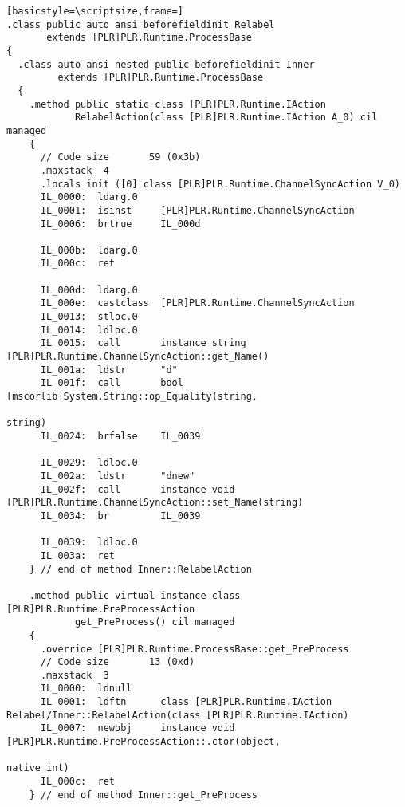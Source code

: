 \begin{lstlisting}[basicstyle=\scriptsize,frame=]
.class public auto ansi beforefieldinit Relabel
       extends [PLR]PLR.Runtime.ProcessBase
{
  .class auto ansi nested public beforefieldinit Inner
         extends [PLR]PLR.Runtime.ProcessBase
  {
    .method public static class [PLR]PLR.Runtime.IAction 
            RelabelAction(class [PLR]PLR.Runtime.IAction A_0) cil managed
    {
      // Code size       59 (0x3b)
      .maxstack  4
      .locals init ([0] class [PLR]PLR.Runtime.ChannelSyncAction V_0)
      IL_0000:  ldarg.0
      IL_0001:  isinst     [PLR]PLR.Runtime.ChannelSyncAction
      IL_0006:  brtrue     IL_000d

      IL_000b:  ldarg.0
      IL_000c:  ret

      IL_000d:  ldarg.0
      IL_000e:  castclass  [PLR]PLR.Runtime.ChannelSyncAction
      IL_0013:  stloc.0
      IL_0014:  ldloc.0
      IL_0015:  call       instance string [PLR]PLR.Runtime.ChannelSyncAction::get_Name()
      IL_001a:  ldstr      "d"
      IL_001f:  call       bool [mscorlib]System.String::op_Equality(string,
                                                                     string)
      IL_0024:  brfalse    IL_0039

      IL_0029:  ldloc.0
      IL_002a:  ldstr      "dnew"
      IL_002f:  call       instance void [PLR]PLR.Runtime.ChannelSyncAction::set_Name(string)
      IL_0034:  br         IL_0039

      IL_0039:  ldloc.0
      IL_003a:  ret
    } // end of method Inner::RelabelAction

    .method public virtual instance class [PLR]PLR.Runtime.PreProcessAction 
            get_PreProcess() cil managed
    {
      .override [PLR]PLR.Runtime.ProcessBase::get_PreProcess
      // Code size       13 (0xd)
      .maxstack  3
      IL_0000:  ldnull
      IL_0001:  ldftn      class [PLR]PLR.Runtime.IAction Relabel/Inner::RelabelAction(class [PLR]PLR.Runtime.IAction)
      IL_0007:  newobj     instance void [PLR]PLR.Runtime.PreProcessAction::.ctor(object,
                                                                                  native int)
      IL_000c:  ret
    } // end of method Inner::get_PreProcess


\end{lstlisting}

